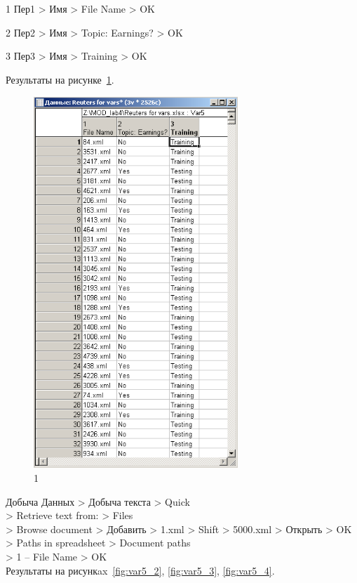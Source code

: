 1 Пер1 > Имя > File Name > OK

2 Пер2 > Имя > Topic: Earnings? > OK

3 Пер3 > Имя > Training > OK

Результаты на рисунке~\ref{fig:var5_1}.

\begin{figure}[!h]
  \centering

  \includegraphics[height=14cm]
  {inc/var5/1.PNG}

  \caption{1}

  \label{fig:var5_1}
\end{figure}

\newpage

Добыча Данных > Добыча текста > Quick \\
> Retrieve text from: > Files \\
> Browse document > Добавить > 1.xml > Shift > 5000.xml > Открыть > OK \\
> Paths in spreadsheet > Document paths \\
> 1 – File Name > OK \\

Результаты на рисункax~\ref{fig:var5_2}, \ref{fig:var5_3}, \ref{fig:var5_4}.

